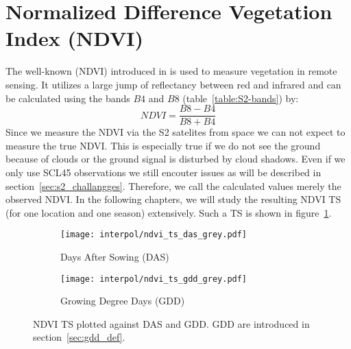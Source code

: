 \section{Normalized Difference Vegetation Index (NDVI)}{%
	The well-known  ({NDVI}) introduced in \cite{rouseMonitoringVernalAdvancement1974} is used to measure vegetation in remote sensing. It utilizes a large jump of reflectancy between red and infrared and can be calculated using the bands $B4$ and $B8$ (table~\ref{table:S2-bands}) by:
	\begin{equation}
		NDVI = \frac{B8 - B4}{B8 + B4}
		\label{eq:ndvi}
	\end{equation}
	Since we measure the NDVI via the S2 satelites from space we can not expect to measure the true NDVI. This is especially true if we do not see the ground because of clouds or the ground signal is disturbed by cloud shadows. Even if we only use SCL45 observations we still encouter issues as will be described in section~\ref{sec:s2_challangges}. Therefore, we call the calculated values merely the {observed NDVI}. In the following chapters, we will study the resulting NDVI {TS} (for one location and one season) extensively. Such a {TS} is shown in figure~\ref{interpol/ndvi_ts_das_grey.pdf}.
	\begin{figure}[!h]
		\centering
		\begin{subfigure}{.47\textwidth}
			\texttt{[image: interpol/ndvi\_ts\_das\_grey.pdf]}
			\caption{Days After Sowing (DAS)}
			\label{interpol/ndvi_ts_das_grey.pdf}
		\end{subfigure}%
		\hfill
		\begin{subfigure}{.47\textwidth}
			\texttt{[image: interpol/ndvi\_ts\_gdd\_grey.pdf]}
			\caption{Growing Degree Days (GDD)}
			\label{interpol/ndvi_ts_gdd_grey.pdf}
		\end{subfigure}
		\caption[NDVI {TS} plotted against DAS and GDD]{NDVI {TS} plotted against DAS and GDD. GDD are introduced in section~\ref{sec:gdd_def}.}
		\label{fig:raw_ndvi_ts}
	\end{figure}
}

